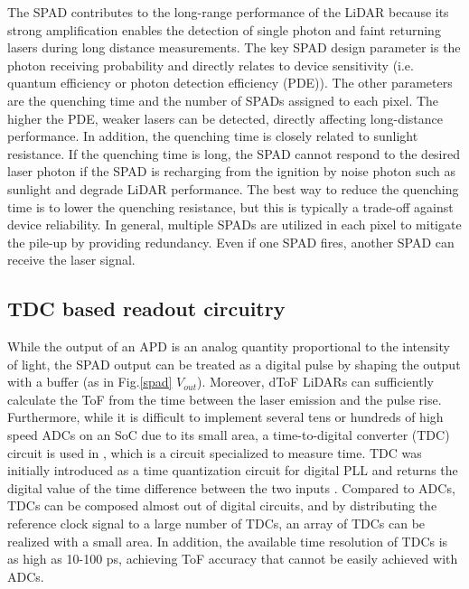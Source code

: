 \documentclass[paper]{ieice}
\begin{document}
The SPAD contributes to the long-range performance of the LiDAR because its strong amplification enables the detection of single photon and faint returning lasers during long distance measurements. The key SPAD design parameter is the photon receiving probability and directly relates to device sensitivity (i.e. quantum efficiency or photon detection efficiency (PDE)). The other parameters are the quenching time and the number of SPADs assigned to each pixel. The higher the PDE, weaker lasers can be detected, directly affecting long-distance performance. In addition, the quenching time is closely related to sunlight resistance. If the quenching time is long, the SPAD cannot respond to the desired laser photon if the SPAD is recharging from the ignition by noise photon such as sunlight and degrade LiDAR performance. The best way to reduce the quenching time is to lower the quenching resistance, but this is typically a trade-off against device reliability. In general, multiple SPADs are utilized in each pixel to mitigate the pile-up by providing redundancy. Even if one SPAD fires, another SPAD can receive the laser signal.

\subsection{TDC based readout circuitry}
\qquad While the output of an APD is an analog quantity proportional to the intensity of light, the SPAD output can be treated as a digital pulse by shaping the output with a buffer (as in Fig.\ref{spad} $V_{out}$). Moreover, dToF LiDARs can sufficiently calculate the ToF from the time between the laser emission and the pulse rise. Furthermore, while it is difficult to implement several tens or hundreds of high speed ADCs on an SoC due to its small area, a time-to-digital converter (TDC) circuit is used in \cite{niclass20130}, which is a circuit specialized to measure time. TDC was initially introduced as a time quantization circuit for digital PLL and returns the digital value of the time difference between the two inputs \cite{leetdc, elkholytdc}.
Compared to ADCs, TDCs can be composed almost out of digital circuits, and by distributing the reference clock signal to a large number of TDCs, an array of TDCs can be realized with a small area. In addition, the available time resolution of TDCs is as high as 10-100 ps, achieving ToF accuracy that cannot be easily achieved with ADCs.
\end{document}
